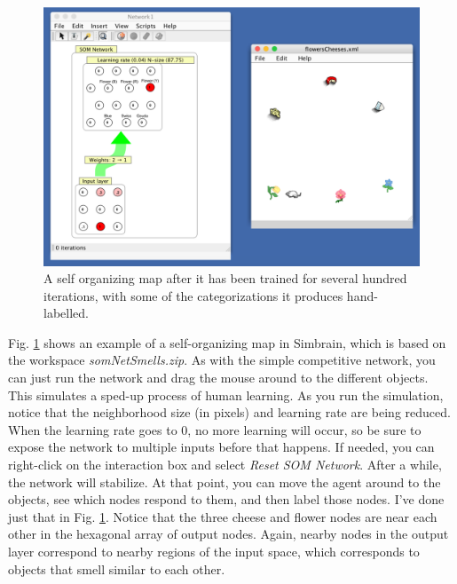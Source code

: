 
\begin{figure}[h]
\centering
\includegraphics[scale=.5]{./images/som_labelled.png}
\caption[Simbrain screenshot.]{A self organizing map after it has been trained for several hundred iterations, with some of the categorizations it produces hand-labelled.}
\label{som_labelled}
\end{figure}

Fig. \ref{som_labelled}  shows an example of a self-organizing map in Simbrain, which is based on the workspace \emph{somNetSmells.zip}. As with the simple competitive network, you can just run the network and drag the mouse around to the different objects. This simulates a sped-up process of human learning. As you run the simulation, notice that the neighborhood size (in pixels) and learning rate are being reduced. When the learning rate goes to 0, no more learning will occur, so be sure to expose the network to multiple inputs before that happens. If needed, you can right-click on the interaction box and select \emph{Reset SOM Network}. After a while, the network will stabilize. At that point, you can move the agent around to the objects, see which nodes respond to them,  and then label those nodes. I've done just that in Fig. \ref{som_labelled}. Notice that the three cheese and flower nodes are near each other in the hexagonal array of output nodes. Again, nearby nodes in the output layer correspond to nearby regions of the input space, which corresponds to objects that smell similar to each other.

